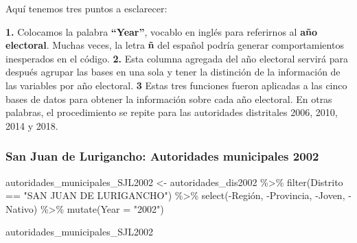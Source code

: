 \documentclass[
]{book}
\newenvironment{Shaded}{\begin{snugshade}}{\end{snugshade}}
\newcommand{\AttributeTok}[1]{\textcolor[rgb]{0.77,0.63,0.00}{#1}}
\newcommand{\FunctionTok}[1]{\textcolor[rgb]{0.00,0.00,0.00}{#1}}
\newcommand{\NormalTok}[1]{#1}
\newcommand{\OtherTok}[1]{\textcolor[rgb]{0.56,0.35,0.01}{#1}}
\newcommand{\SpecialCharTok}[1]{\textcolor[rgb]{0.00,0.00,0.00}{#1}}
\newcommand{\StringTok}[1]{\textcolor[rgb]{0.31,0.60,0.02}{#1}}
\begin{document}
Aquí tenemos tres puntos a esclarecer:

\textbf{1.} Colocamos la palabra \textbf{``Year''}, vocablo en inglés para referirnos al \textbf{año electoral}. Muchas veces, la letra \textbf{ñ} del español podría generar comportamientos inesperados en el código.
\textbf{2.} Esta columna agregada del año electoral servirá para después agrupar las bases en una sola y tener la distinción de la información de las variables por año electoral.
\textbf{3} Estas tres funciones fueron aplicadas a las cinco bases de datos para obtener la información sobre cada año electoral. En otras palabras, el procedimiento se repite para las autoridades distritales 2006, 2010, 2014 y 2018.

\hypertarget{san-juan-de-lurigancho-autoridades-municipales-2002}{%
\subsubsection{San Juan de Lurigancho: Autoridades municipales 2002}\label{san-juan-de-lurigancho-autoridades-municipales-2002}}

\begin{Shaded}
\begin{Highlighting}[]
\NormalTok{autoridades\_municipales\_SJL2002 }\OtherTok{\textless{}{-}}\NormalTok{ autoridades\_dis2002 }\SpecialCharTok{\%\textgreater{}\%}
  \FunctionTok{filter}\NormalTok{(Distrito }\SpecialCharTok{==} \StringTok{"SAN JUAN DE LURIGANCHO"}\NormalTok{) }\SpecialCharTok{\%\textgreater{}\%}
  \FunctionTok{select}\NormalTok{(}\SpecialCharTok{{-}}\NormalTok{Región, }\SpecialCharTok{{-}}\NormalTok{Provincia, }\SpecialCharTok{{-}}\NormalTok{Joven, }\SpecialCharTok{{-}}\NormalTok{Nativo) }\SpecialCharTok{\%\textgreater{}\%}
  \FunctionTok{mutate}\NormalTok{(}\AttributeTok{Year =} \StringTok{"2002"}\NormalTok{)}
\end{Highlighting}
\end{Shaded}

\begin{Shaded}
\begin{Highlighting}[]
\NormalTok{autoridades\_municipales\_SJL2002}
\end{Highlighting}
\end{Shaded}
\end{document}
